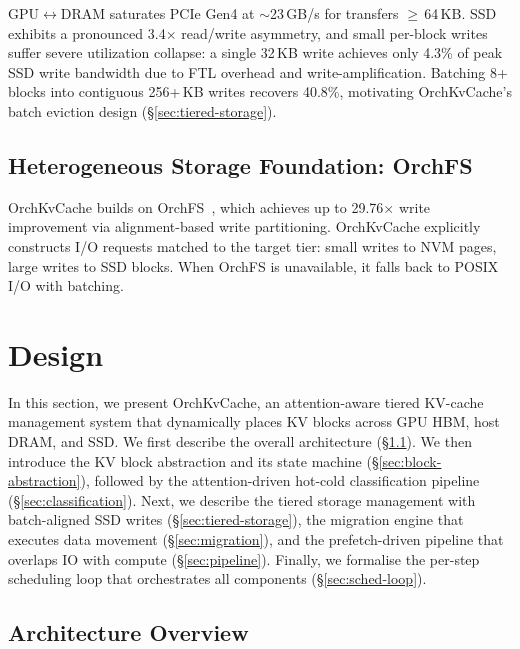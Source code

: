 \documentclass[conference]{IEEEtran}
\begin{document}
GPU$\leftrightarrow$DRAM saturates PCIe Gen4 at ${\sim}$23\,GB/s for transfers $\geq$\,64\,KB. SSD exhibits a pronounced 3.4$\times$ read/write asymmetry, and small per-block writes suffer severe utilization collapse: a single 32\,KB write achieves only 4.3\% of peak SSD write bandwidth due to FTL overhead and write-amplification. Batching 8+ blocks into contiguous 256+\,KB writes recovers 40.8\%, motivating OrchKvCache's batch eviction design (\S\ref{sec:tiered-storage}).

\subsection{Heterogeneous Storage Foundation: OrchFS}

OrchKvCache builds on OrchFS~\cite{orchfs}, which achieves up to 29.76$\times$ write improvement via alignment-based write partitioning. OrchKvCache explicitly constructs I/O requests matched to the target tier: small writes to NVM pages, large writes to SSD blocks. When OrchFS is unavailable, it falls back to POSIX I/O with batching.




\section{Design}
In this section, we present OrchKvCache, an attention-aware tiered KV-cache management system that dynamically places KV blocks across GPU HBM, host DRAM, and SSD. We first describe the overall architecture (\S\ref{sec:arch-overview}). We then introduce the KV block abstraction and its state machine (\S\ref{sec:block-abstraction}), followed by the attention-driven hot-cold classification pipeline (\S\ref{sec:classification}). Next, we describe the tiered storage management with batch-aligned SSD writes (\S\ref{sec:tiered-storage}), the migration engine that executes data movement (\S\ref{sec:migration}), and the prefetch-driven pipeline that overlaps IO with compute (\S\ref{sec:pipeline}). Finally, we formalise the per-step scheduling loop that orchestrates all components (\S\ref{sec:sched-loop}).

\subsection{Architecture Overview}
\label{sec:arch-overview}
\end{document}
